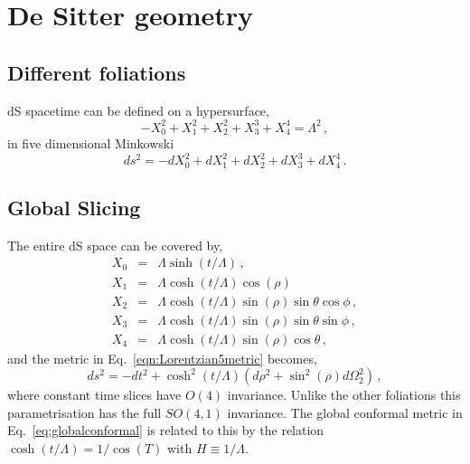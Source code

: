 \documentclass[a4paper,11pt]{article}
\numberwithin{equation}{section}
\begin{document}
\section{De Sitter geometry}
\label{sec:dSGeometry}

\subsection{Different foliations}
dS spacetime can be defined on a hypersurface,
\begin{equation}
-X_0^2+X_1^2+X_2^2+X_3^3+X_4^4=\Lambda^2 \,,
\end{equation}
in five dimensional Minkowski
\begin{equation}
ds^2=-dX_0^2+dX_1^2+dX_2^2+dX_3^3+dX_4^4 \,.
\label{eqn:Lorentzian5metric}
\end{equation}
\subsection*{Global Slicing}
The entire dS space can be  covered by,
\begin{eqnarray}
X_0&=&\Lambda\sinh(t/\Lambda) \,,\nonumber\\\label{foliation:global}
X_1&=&\Lambda \cosh(t/\Lambda)\cos(\rho)\\
X_2&=&\Lambda \cosh(t/\Lambda)\sin(\rho)\sin\theta\cos\phi \,, \nonumber\\
X_3&=&\Lambda  \cosh(t/\Lambda)\sin(\rho)\sin\theta\sin\phi \,, \nonumber\\
X_4&=&\Lambda \cosh(t/\Lambda)\sin(\rho)\cos\theta \,, \nonumber
\end{eqnarray}
and the metric in Eq.~\eqref{eqn:Lorentzian5metric} becomes,
\begin{equation}
ds^2=-dt^2+\cosh^2( t/\Lambda)\left(d\rho^2+\sin^2(\rho) d\Omega_2^2\right) \,,
\end{equation}
where constant time slices have $O(4)$ invariance.
Unlike the other foliations this parametrisation has the full $SO(4,1)$ invariance. The global conformal metric in Eq.~\eqref{eq:globalconformal} is related to this
by the relation $\cosh(t/\Lambda)=1/\cos(T)$ with $H\equiv 1/\Lambda$.
\end{document}
